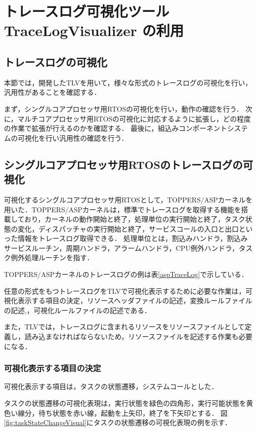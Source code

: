 \chapter{トレースログ可視化ツール TraceLogVisualizer の利用}

\section{トレースログの可視化}
本節では，開発したTLVを用いて，様々な形式のトレースログの可視化を行い，汎用性があることを確認する．

まず，シングルコアプロセッサ用RTOSの可視化を行い，動作の確認を行う．
次に，マルチコアプロセッサ用RTOSの可視化に対応するように拡張し，どの程度の作業で拡張が行えるのかを確認する．
最後に，組込みコンポーネントシステムの可視化を行い汎用性の確認を行う．
\fi

\section{シングルコアプロセッサ用RTOSのトレースログの可視化}
可視化するシングルコアプロセッサ用RTOSとして，TOPPERS/ASPカーネルを用いた．TOPPERS/ASPカーネルは，標準でトレースログを取得する機能を搭載しており，カーネルの動作開始と終了，処理単位の実行開始と終了，タスク状態の変化，ディスパッチャの実行開始と終了，サービスコールの入口と出口といった情報をトレースログ取得できる．
処理単位とは，割込みハンドラ，割込みサービスルーチン，周期ハンドラ，アラームハンドラ，CPU例外ハンドラ，タスク例外処理ルーチンを指す．

TOPPERS/ASPカーネルのトレースログの例は表\ref{aspTraceLog}で示している．

任意の形式をもつトレースログをTLVで可視化表示するために必要な作業は，可視化表示する項目の決定，リソースヘッダファイルの記述，変換ルールファイルの記述,，可視化ルールファイルの記述である．

また，TLVでは，トレースログに含まれるリソースをリソースファイルとして定義し，読み込まなければならないため，リソースファイルを記述する作業も必要になる．

\subsection{可視化表示する項目の決定}
\label{subsec414}

可視化表示する項目は，タスクの状態遷移，システムコールとした．

タスクの状態遷移の可視化表現は，実行状態を緑色の四角形，実行可能状態を黄色い線分，待ち状態を赤い線，起動を上矢印，終了を下矢印とする．
図\ref{fig:taskStateChangeVisual}にタスクの状態遷移の可視化表現の例を示す．

